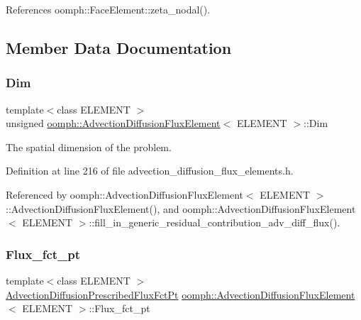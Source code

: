 References oomph\+::\+Face\+Element\+::zeta\+\_\+nodal().



\subsection{Member Data Documentation}
\mbox{\label{classoomph_1_1AdvectionDiffusionFluxElement_a9418de31c96e89d011b6627cb5756e1e}} 
\subsubsection{\texorpdfstring{Dim}{Dim}}
{\footnotesize\ttfamily template$<$class E\+L\+E\+M\+E\+NT $>$ \\
unsigned \hyperlink{classoomph_1_1AdvectionDiffusionFluxElement}{oomph\+::\+Advection\+Diffusion\+Flux\+Element}$<$ E\+L\+E\+M\+E\+NT $>$\+::Dim\hspace{0.3cm}{\ttfamily [private]}}



The spatial dimension of the problem. 



Definition at line 216 of file advection\+\_\+diffusion\+\_\+flux\+\_\+elements.\+h.



Referenced by oomph\+::\+Advection\+Diffusion\+Flux\+Element$<$ E\+L\+E\+M\+E\+N\+T $>$\+::\+Advection\+Diffusion\+Flux\+Element(), and oomph\+::\+Advection\+Diffusion\+Flux\+Element$<$ E\+L\+E\+M\+E\+N\+T $>$\+::fill\+\_\+in\+\_\+generic\+\_\+residual\+\_\+contribution\+\_\+adv\+\_\+diff\+\_\+flux().

\mbox{\label{classoomph_1_1AdvectionDiffusionFluxElement_a7c0b0eda4c03c14b18963c59b2c80a67}} 
\subsubsection{\texorpdfstring{Flux\+\_\+fct\+\_\+pt}{Flux\_fct\_pt}}
{\footnotesize\ttfamily template$<$class E\+L\+E\+M\+E\+NT $>$ \\
\hyperlink{classoomph_1_1AdvectionDiffusionFluxElement_aeb9eb0a65d6dfe3673f6910a6fd7cf59}{Advection\+Diffusion\+Prescribed\+Flux\+Fct\+Pt} \hyperlink{classoomph_1_1AdvectionDiffusionFluxElement}{oomph\+::\+Advection\+Diffusion\+Flux\+Element}$<$ E\+L\+E\+M\+E\+NT $>$\+::Flux\+\_\+fct\+\_\+pt\hspace{0.3cm}{\ttfamily [private]}}



